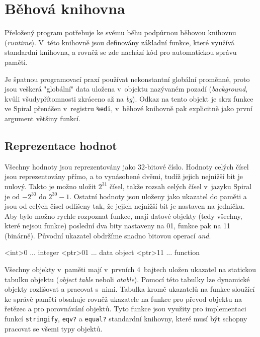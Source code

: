 \chapter{Běhová knihovna}

Přeložený program potřebuje ke svému běhu podpůrnou běhovou knihovnu
(\emph{runtime}). V~této knihovně jsou definovány základní funkce, které využívá
standardní knihovna, a rovněž se zde nachází kód pro automatickou správu paměti.

Je špatnou programovací praxí používat nekonstantní globální proměnné, proto
jsou veškerá "globální" data uložena v~objektu nazývaném pozadí
(\emph{background}, kvůli všudypřítomnosti zkráceno až na \emph{bg}). Odkaz na
tento objekt je skrz funkce ve Spiral přenášen v~registru \texttt{\%edi},
v~běhové knihovně pak explicitně jako první argument většiny funkcí.

\section{Reprezentace hodnot}

Všechny hodnoty jsou reprezentovány jako 32-bitové číslo. Hodnoty celých čísel
jsou reprezentovány přímo, a to vynásobené dvěmi, tudíž jejich nejnižší bit je
nulový. Takto je možno uložit $2^{31}$ čísel, takže rozsah celých čísel v~jazyku
Spiral je od $-2^{30}$ do $2^{30}-1$. Ostatní hodnoty jsou uloženy jako ukazatel
do paměti a jsou od celých čísel odlišeny tak, že jejich nejnižší bit je
nastaven na jedničku. Aby bylo možno rychle rozpoznat funkce, mají datové
objekty (tedy všechny, které nejsou funkce) poslední dva bity nastaveny na 01,
funkce pak na 11 (binárně). Původní ukazatel obdržíme snadno bitovou operací
\emph{and}.

\begin{ttcode}
   <int>0 ... integer
  <ptr>01 ... data object
  <ptr>11 ... function
\end{ttcode}

Všechny objekty v~paměti mají v~prvních 4~bajtech uložen ukazatel na statickou
tabulku objektu (\emph{object table} neboli \emph{otable}). Pomocí této tabulky
lze dynamické objekty rozlišovat a pracovat s~nimi. Tabulka kromě ukazatelů na
funkce sloužící ke správě paměti obsahuje rovněž ukazatele na funkce pro převod
objektu na řetězec a pro porovnávání objektů. Tyto funkce jsou využity pro
implementaci funkcí \texttt{stringify}, \texttt{eqv?} a \texttt{equal?}
standardní knihovny, které musí být schopny pracovat se všemi typy objektů.

